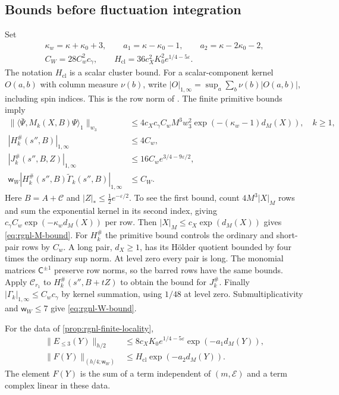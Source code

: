 \documentclass[11pt,letterpaper,reqno]{amsart}
\begin{document}
\subsection{Bounds before fluctuation integration}
\label{subsec:rgnl-finite-bounds}

Set
\[
 \begin{gathered}
 \kappa_w=\kappa+\kappa_0+3,\qquad
 a_1=\kappa-\kappa_0-1,\qquad a_2=\kappa-2\kappa_0-2,\\
 C_W=28C_w^2c_\gamma,
 \qquad H_{\mathrm{cl}}=36c_X^2K_0^2e^{1/4-5\varepsilon}.
 \end{gathered}
\]
The notation $H_{\mathrm{cl}}$ is a scalar cluster bound. For a
scalar-component kernel $O(a,b)$ with column measure $\nu(b)$, write
$|O|_{1,\infty}=\sup_a\sum_b\nu(b)|O(a,b)|$, including spin indices.
This is the row norm of \cite[Theorem~B]{NormalizedContraction}.
The finite primitive bounds imply
\begin{align}
 \|\langle\bar\Psi,M_k(X,B)\Psi\rangle_1\|_{w_3}
 &\le4c_Xc_\gamma C_wM^3w_3^2
                   \exp(-(\kappa_w-1)d_M(X)),\quad k\ge1,
                                      \label{eq:rgnl-M-bound}\\
 |H_k^\#(s'',B)|_{1,\infty}&\le4C_w,\\
 |J_k^\#(s'',B,Z)|_{1,\infty}
                  &\le16C_we^{3/4-9\varepsilon/2},\\
 \mathsf w_W|H_k^\#(s'',B)\widetilde\Gamma_k(s'',B)|_{1,\infty}
                  &\le C_W.           \label{eq:rgnl-W-bound}
\end{align}
Here $B=A+\mathscr C$ and $|Z|_*\le\frac12e^{-\varepsilon/2}$.
To see the first bound, count $4M^3|X|_M$ rows and sum
the exponential kernel in its second index, giving
$c_\gamma C_w \exp(-\kappa_wd_M(X))$ per row.
Then $|X|_M\le c_X\exp(d_M(X))$ gives
\eqref{eq:rgnl-M-bound}.
For $H_k^\#$ the primitive bound controls the ordinary
and short-pair rows by $C_w$. A long pair, $d_X\ge1$,
has its H\"older quotient bounded by four times the
ordinary sup norm. At level zero every pair is long.
The monomial matrices $\mathsf C^{\pm1}$ preserve row norms,
so the barred rows have the same bounds.
Apply $\mathcal C_{r_1}$ to
$H_k^\#(s'',B+tZ)$ to obtain the bound for $J_k^\#$.
Finally $|\Gamma_k|_{1,\infty}\le C_wc_\gamma$ by kernel
summation, using $1/48$ at level zero. Submultiplicativity
and $\mathsf w_W\le7$ give \eqref{eq:rgnl-W-bound}.

\begin{proposition}\label{prop:rgnl-finite-bounds}
For the data of \cref{prop:rgnl-finite-locality},
\begin{align}
 \|E_{\le3}(Y)\|_{h/2}
       &\le8c_XK_0e^{1/4-5\varepsilon}\exp(-a_1d_M(Y)),
                                      \label{eq:rgnl-E3-bound}\\
 \|F(Y)\|_{(h/4;\mathsf w_W)}
       &\le H_{\mathrm{cl}}\exp(-a_2d_M(Y)).
                                      \label{eq:rgnl-F-bound}
\end{align}
The element $F(Y)$ is the sum of a term independent of
$(m,\mathscr E)$ and a term complex linear in these data.
\end{proposition}
\end{document}

